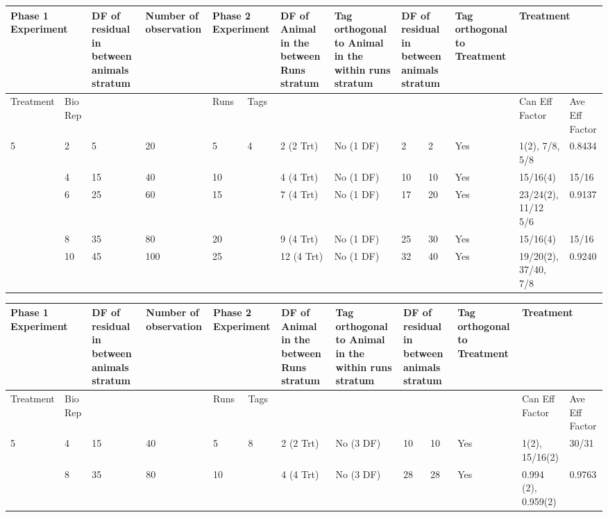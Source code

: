 \begin{tabular}{|p{0.5in}|p{0.3in}|p{0.7in}|p{0.7in}|p{0.3in}|p{0.3in}|p{0.7in}|p{0.7in}|p{0.2in}|p{0.4in}|p{0.6in}|p{0.5in}|p{0.4in}|} \hline 
\multicolumn{2}{|p{1in}|}{Phase 1 Experiment} & DF of residual in between animals stratum & Number of observation  & \multicolumn{2}{|p{0.7in}|}{Phase 2 Experiment} & DF of Animal in the between Runs stratum  & Tag orthogonal to Animal in the within runs stratum & \multicolumn{2}{|p{0.6in}|}{DF of residual in between animals stratum} & Tag orthogonal to Treatment & \multicolumn{2}{|p{0.9in}|}{Treatment} \\ \hline 
Treatment & Bio Rep &  &  & Runs & Tags  &  &  & \multicolumn{2}{|p{0.6in}|}{} &  & Can Eff Factor & Ave Eff Factor \\ \hline 
5 & 2 & 5 & 20 & 5 & 4 & 2 (2 Trt) & No (1 DF) & 2 & 2 & Yes & 1(2), 7/8, 5/8 & 0.8434 \\ \hline 
 & 4 & 15 & 40 & 10 &  & 4 (4 Trt) & No (1 DF) & 10 & 10 & Yes & 15/16(4) & 15/16 \\ \hline 
 & 6 & 25 & 60 & 15 &  & 7 (4 Trt) & No (1 DF) & 17 & 20 & Yes & 23/24(2), 11/12   5/6 & 0.9137 \\ \hline 
 & 8 & 35 & 80 & 20 &  & 9 (4 Trt) & No (1 DF) & 25 & 30 & Yes & 15/16(4) & 15/16 \\ \hline 
 & 10 & 45 & 100 & 25 &  & 12 (4 Trt) & No (1 DF) & 32 & 40 & Yes & 19/20(2), 37/40,   7/8 & 0.9240 \\ \hline 
\end{tabular}



\noindent 

\begin{tabular}{|p{0.5in}|p{0.3in}|p{0.7in}|p{0.7in}|p{0.3in}|p{0.3in}|p{0.7in}|p{0.7in}|p{0.2in}|p{0.4in}|p{0.6in}|p{0.5in}|p{0.4in}|} \hline 
\multicolumn{2}{|p{1in}|}{Phase 1 Experiment} & DF of residual in between animals stratum & Number of observation  & \multicolumn{2}{|p{0.7in}|}{Phase 2 Experiment} & DF of Animal in the between Runs stratum  & Tag orthogonal to Animal in the within runs stratum & \multicolumn{2}{|p{0.6in}|}{DF of residual in between animals stratum} & Tag orthogonal to Treatment & \multicolumn{2}{|p{0.9in}|}{Treatment} \\ \hline 
Treatment & Bio Rep &  &  & Runs & Tags  &  &  & \multicolumn{2}{|p{0.6in}|}{} &  & Can Eff Factor & Ave Eff Factor \\ \hline 
5 & 4 & 15 & 40 & 5 & 8 & 2 (2 Trt) & No (3 DF) & 10 & 10 & Yes & 1(2), 15/16(2) & 30/31 \\ \hline 
 & 8 & 35 & 80 & 10 &  & 4 (4 Trt) & No (3 DF) & 28 & 28 & Yes & 0.994 (2), 0.959(2) & 0.9763 \\ \hline 
\end{tabular}



